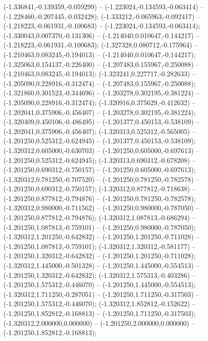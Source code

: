  (-1.336841,-0.139359,-0.059299) -- (-1.223024,-0.134593,-0.063414) -- (-1.228460,-0.207445,-0.032428);
 (-1.333212,-0.065963,-0.092417) -- (-1.218223,-0.061931,-0.100683) -- (-1.223024,-0.134593,-0.063414);
 (-1.330043,0.007370,-0.131306) -- (-1.214040,0.010647,-0.144217) -- (-1.218223,-0.061931,-0.100683);
 (-1.327328,0.080712,-0.175964) -- (-1.210463,0.083245,-0.194013) -- (-1.214040,0.010647,-0.144217);
 (-1.325063,0.154137,-0.226400) -- (-1.207483,0.155967,-0.250088) -- (-1.210463,0.083245,-0.194013);
 (-1.323241,0.227717,-0.282633) -- (-1.205090,0.228916,-0.312474) -- (-1.207483,0.155967,-0.250088);
 (-1.321860,0.301523,-0.344696) -- (-1.203278,0.302195,-0.381224) -- (-1.205090,0.228916,-0.312474);
 (-1.320916,0.375629,-0.412632) -- (-1.202041,0.375906,-0.456407) -- (-1.203278,0.302195,-0.381224);
 (-1.320409,0.450106,-0.486495) -- (-1.201377,0.450153,-0.538109) -- (-1.202041,0.375906,-0.456407);
 (-1.320313,0.525312,-0.565005) -- (-1.201250,0.525312,-0.624945) -- (-1.201377,0.450153,-0.538109);
 (-1.320312,0.605000,-0.630703) -- (-1.201250,0.605000,-0.697613) -- (-1.201250,0.525312,-0.624945);
 (-1.320313,0.690312,-0.678208) -- (-1.201250,0.690312,-0.750157) -- (-1.201250,0.605000,-0.697613);
 (-1.320312,0.781250,-0.707520) -- (-1.201250,0.781250,-0.782578) -- (-1.201250,0.690312,-0.750157);
 (-1.320312,0.877812,-0.718638) -- (-1.201250,0.877812,-0.794876) -- (-1.201250,0.781250,-0.782578);
 (-1.320312,0.980000,-0.711562) -- (-1.201250,0.980000,-0.787050) -- (-1.201250,0.877812,-0.794876);
 (-1.320312,1.087813,-0.686294) -- (-1.201250,1.087813,-0.759101) -- (-1.201250,0.980000,-0.787050);
 (-1.320312,1.201250,-0.642832) -- (-1.201250,1.201250,-0.711028) -- (-1.201250,1.087813,-0.759101);
 (-1.320312,1.320312,-0.581177) -- (-1.201250,1.320312,-0.642832) -- (-1.201250,1.201250,-0.711028);
 (-1.320312,1.445000,-0.501328) -- (-1.201250,1.445000,-0.554513) -- (-1.201250,1.320312,-0.642832);
 (-1.320312,1.575313,-0.403286) -- (-1.201250,1.575312,-0.446070) -- (-1.201250,1.445000,-0.554513);
 (-1.320312,1.711250,-0.287051) -- (-1.201250,1.711250,-0.317503) -- (-1.201250,1.575312,-0.446070);
 (-1.320312,1.852812,-0.152622) -- (-1.201250,1.852812,-0.168813) -- (-1.201250,1.711250,-0.317503);
 (-1.320312,2.000000,0.000000) -- (-1.201250,2.000000,0.000000) -- (-1.201250,1.852812,-0.168813);
